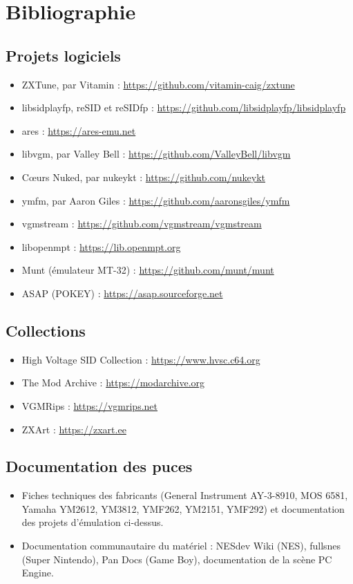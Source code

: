 \chapter{Bibliographie}

\section*{Projets logiciels}
\begin{itemize}
  \item ZXTune, par Vitamin : \url{https://github.com/vitamin-caig/zxtune}
  \item libsidplayfp, reSID et reSIDfp : \url{https://github.com/libsidplayfp/libsidplayfp}
  \item ares : \url{https://ares-emu.net}
  \item libvgm, par Valley Bell : \url{https://github.com/ValleyBell/libvgm}
  \item Cœurs Nuked, par nukeykt : \url{https://github.com/nukeykt}
  \item ymfm, par Aaron Giles : \url{https://github.com/aaronsgiles/ymfm}
  \item vgmstream : \url{https://github.com/vgmstream/vgmstream}
  \item libopenmpt : \url{https://lib.openmpt.org}
  \item Munt (émulateur MT-32) : \url{https://github.com/munt/munt}
  \item ASAP (POKEY) : \url{https://asap.sourceforge.net}
\end{itemize}

\section*{Collections}
\begin{itemize}
  \item High Voltage SID Collection : \url{https://www.hvsc.c64.org}
  \item The Mod Archive : \url{https://modarchive.org}
  \item VGMRips : \url{https://vgmrips.net}
  \item ZXArt : \url{https://zxart.ee}
\end{itemize}

\section*{Documentation des puces}
\begin{itemize}
  \item Fiches techniques des fabricants (General Instrument AY-3-8910, MOS 6581, Yamaha YM2612, YM3812, YMF262,
        YM2151, YMF292) et documentation des projets d'émulation ci-dessus.
  \item Documentation communautaire du matériel : NESdev Wiki (NES), fullsnes (Super Nintendo), Pan Docs
        (Game Boy), documentation de la scène PC Engine.
\end{itemize}

